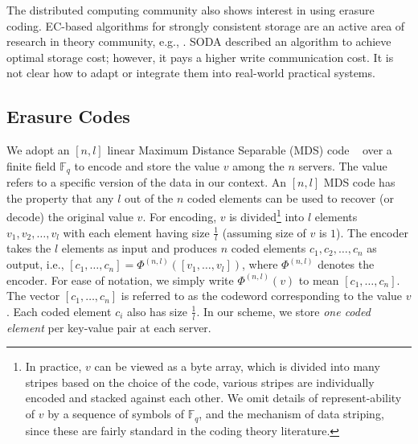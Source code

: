The distributed computing community also shows interest in using erasure coding.
EC-based algorithms for strongly consistent storage are an active area of research in theory community, e.g., \cite{CadambeLMM17, SODA2016, LDS2017, NicolaouC0KML19}.  SODA\cite{SODA2016} described an algorithm to achieve optimal storage cost; however, it pays a 
higher write communication cost.  It is not clear how to adapt or integrate them into real-world practical systems.



\subsection{Erasure Codes}
We adopt an $[n, l]$  linear Maximum Distance Separable (MDS) code ~\cite{verapless_book} over a finite field $\mathbb{F}_q$ to encode and store the value $v$ among the $n$ servers. The value refers to a specific version of the data in our context. An $[n, l]$ MDS code has the property that any $l$ out of the $n$ coded elements can be used to recover (or decode) the original value $v$. 
For encoding, $v$ is divided\footnote{In practice, $v$ can be viewed as a byte array, which is divided into many stripes based on the choice of the code, various stripes are individually encoded and stacked against each other. We omit details of represent-ability of $v$ by a sequence of symbols of $\mathbb{F}_q$, and the mechanism of data striping, since these are fairly standard in the coding theory literature.} into $l$ elements $v_1, v_2, \ldots, v_l$ with each element having  size $\frac{1}{l}$ (assuming size of $v$ is $1$). The encoder takes the $l$ elements as input and produces $n$ coded elements $c_1, c_2, \ldots, c_n$ as output, i.e., $[c_1, \ldots, c_n] = \Phi^{(n,l)}([v_1, \ldots, v_l])$, where $\Phi^{(n, l)}$ denotes the encoder. For ease of notation, we simply write $\Phi^{(n, l)}(v)$ to mean  $[c_1, \ldots, c_n]$. The vector $[c_1, \ldots, c_n]$ is  referred to as the codeword corresponding to the value $v$. Each coded element $c_i$ also has  size $\frac{1}{l}$. In our scheme, we store \textit{one coded element} per key-value pair at each server. 

